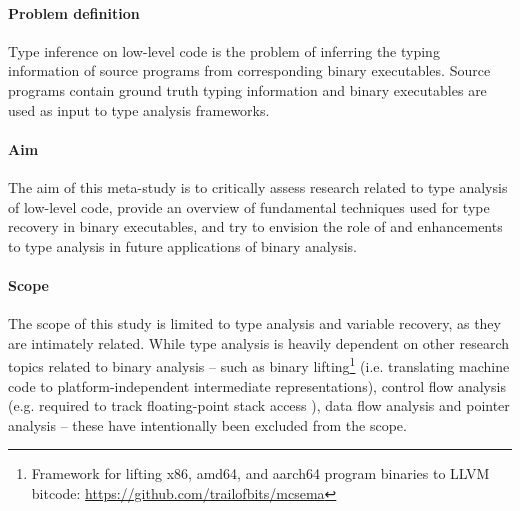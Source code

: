 

\paragraph{Problem definition}

Type inference on low-level code is the problem of inferring the typing information of source programs from corresponding binary executables. Source programs contain ground truth typing information and binary executables are used as input to type analysis frameworks.


\paragraph{Aim}

The aim of this meta-study is to critically assess research related to type analysis of low-level code, provide an overview of fundamental techniques used for type recovery in binary executables, and try to envision the role of and enhancements to type analysis in future applications of binary analysis.


\paragraph{Scope}

The scope of this study is limited to type analysis and variable recovery, as they are intimately related. While type analysis is heavily dependent on other research topics related to binary analysis -- such as binary lifting\footnote{Framework for lifting x86, amd64, and aarch64 program binaries to LLVM bitcode: \url{https://github.com/trailofbits/mcsema}} (i.e. translating machine code to platform-independent intermediate representations), control flow analysis (e.g. required to track floating-point stack access \cite{tie_reverse_engineering_of_types}), data flow analysis and pointer analysis -- these have intentionally been excluded from the scope.

